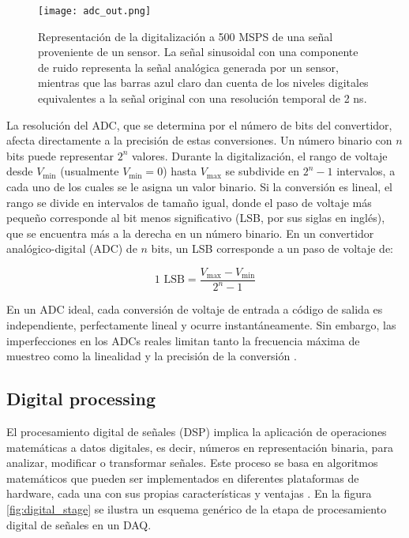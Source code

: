 \documentclass{report}
\begin{document}
\begin{figure}[h]
    \centering
    \texttt{[image: adc\_out.png]}
    \caption{Representación de la digitalización a 500 MSPS de una señal proveniente de un sensor. La señal sinusoidal con una componente de ruido representa la señal analógica generada por un sensor, mientras que las barras azul claro dan cuenta de los niveles digitales equivalentes a la señal original con una resolución temporal de 2 ns.}
    \label{fig:adc_out}
\end{figure}

\noindent La resolución del ADC, que se determina por el número de bits del convertidor, afecta directamente a la precisión de estas conversiones. Un número binario con $n$ bits puede representar $2^{n}$ valores. Durante la digitalización, el rango de voltaje desde $V_{\text{min}}$ (usualmente $V_{\text{min}} = 0$) hasta $V_{\text{max}}$ se subdivide en $2^{n} - 1$ intervalos, a cada uno de los cuales se le asigna un valor binario. Si la conversión es lineal, el rango se divide en intervalos de tamaño igual, donde el paso de voltaje más pequeño corresponde al bit menos significativo (LSB, por sus siglas en inglés), que se encuentra más a la derecha en un número binario. En un convertidor analógico-digital (ADC) de $n$ bits, un LSB corresponde a un paso de voltaje de:

\begin{equation}
    1 \text{ LSB} = \frac{V_{\text{max}} - V_{\text{min}}}{2^n - 1}
\end{equation}

\noindent En un ADC ideal, cada conversión de voltaje de entrada a código de salida es independiente, perfectamente lineal y ocurre instantáneamente. Sin embargo, las imperfecciones en los ADCs reales limitan tanto la frecuencia máxima de muestreo como la linealidad y la precisión de la conversión \cite{kolanoski7}.

\subsection{Digital processing}
\label{sec:digital_processing}

\noindent El procesamiento digital de señales (DSP) implica la aplicación de operaciones matemáticas a datos digitales, es decir, números en representación binaria, para analizar, modificar o transformar señales. Este proceso se basa en algoritmos matemáticos que pueden ser implementados en diferentes plataformas de hardware, cada una con sus propias características y ventajas \cite{proakis1}. En la figura \ref{fig:digital_stage} se ilustra un esquema genérico de la etapa de procesamiento digital de señales en un DAQ.\\
\end{document}
